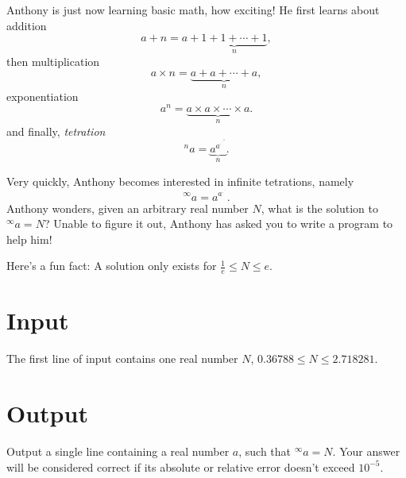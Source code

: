 \def\rddots#1{\cdot^{\cdot^{\cdot^{#1}}}}
\def\rddotse{\cdot^{\cdot^{\cdot}}}


Anthony is just now learning basic math, how exciting! He first learns about addition
\[
a+n=a+\underbrace{1+1+\cdots+1}_n,
\]
then multiplication
\[
a\times n=\underbrace{a+a+\cdots+a}_n,
\]
exponentiation
\[
a^n=\underbrace{a\times a\times\cdots\times a}_n.
\]
and finally, \emph{tetration}
\[
^na=\underbrace{a^{a^{\rddots a}}}_n.
\]

Very quickly, Anthony becomes interested in infinite tetrations, namely
\[
^\infty a={a^{a^{\rddotse}}}.
\]
Anthony wonders, given an arbitrary real number $N$, what is the solution to $^\infty a=N$? Unable to figure it out, Anthony has asked you to write a program to help him!

Here's a fun fact: A solution only exists for $\frac{1}{e}\leq N\leq e$.

\section*{Input}
The first line of input contains one real number $N$, $0.36788\leq N\leq2.718281$.

\section*{Output}
Output a single line containing a real number $a$, such that $^\infty a=N$. 
Your answer will be considered correct if its absolute or relative error doesn't exceed $10^{-5}$.